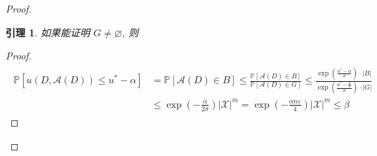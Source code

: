 \documentclass[8pt]{article}
\theoremstyle{compact}
\newtheorem{lemma}{引理}[section]
\def\le{\leqslant}
\def\P#1{\mathbb{P}\left[{#1}\right]}
\begin{document}
\begin{proof}
	\begin{lemma}
		如果能证明 $G \neq \varnothing$, 则
	\end{lemma}
	\begin{proof}
		\begin{align*}
			\begin{split}
				\P{u(D, \mathcal A(D)) \le u^* - \alpha} &= \P{\mathcal A(D) \in B} \le \frac{\P{\mathcal A(D) \in B}}{\P{\mathcal A(D) \in G}} \le \frac{\exp\left(\frac{u^* - \alpha}{\sigma}\right)\cdot |B|}{\exp\left(\frac{u^* - \frac{\alpha}{2}}{\sigma}\right)\cdot |G|} \\&\le \exp\left(-\frac{\alpha}{2\sigma}\right)|\mathcal X|^m = \exp\left(-\frac{\alpha n \varepsilon}{4}\right)|\mathcal X|^m \le \beta
			\end{split}
		\end{align*}
	\end{proof}
	
\end{proof}
\end{document}
